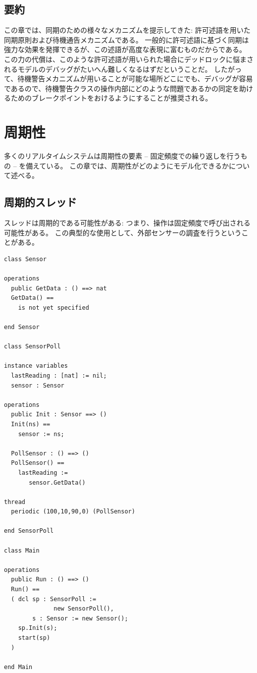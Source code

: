 \documentclass[\pformat,12pt]{jreport}
\begin{document}
\section{要約}

この章では、同期のための様々なメカニズムを提示してきた: 許可述語を用いた同期原則および待機通告メカニズムである。
一般的に許可述語に基づく同期は強力な効果を発揮できるが、この述語が高度な表現に富むものだからである。
この力の代償は、このような許可述語が用いられた場合にデッドロックに悩まされるモデルのデバッグがたいへん難しくなるはずだということだ。
したがって、待機警告メカニズムが用いることが可能な場所どこにでも、デバッグが容易であるので、待機警告クラスの操作内部にどのような問題であるかの同定を助けるためのブレークポイントをおけるようにすることが推奨される。


\chapter{周期性}\label{chap:period}

多くのリアルタイムシステムは周期性の要素 -- 固定頻度での繰り返しを行うもの -- を備えている。
この章では、周期性がどのようにモデル化できるかについて述べる。

\section{周期的スレッド}\label{sec:periodthread}

スレッドは周期的である可能性がある: つまり、操作は固定頻度で呼び出される可能性がある。 
この典型的な使用として、外部センサーの調査を行うということがある。

\begin{lstlisting}
class Sensor

operations
  public GetData : () ==> nat
  GetData() ==
    is not yet specified

end Sensor

class SensorPoll

instance variables
  lastReading : [nat] := nil;
  sensor : Sensor

operations
  public Init : Sensor ==> ()
  Init(ns) ==
    sensor := ns;

  PollSensor : () ==> ()
  PollSensor() ==
    lastReading :=
       sensor.GetData()

thread
  periodic (100,10,90,0) (PollSensor)

end SensorPoll

class Main

operations
  public Run : () ==> ()
  Run() ==
  ( dcl sp : SensorPoll :=
              new SensorPoll(),
        s : Sensor := new Sensor();
    sp.Init(s);
    start(sp)
  )

end Main
\end{lstlisting}
\end{document}
